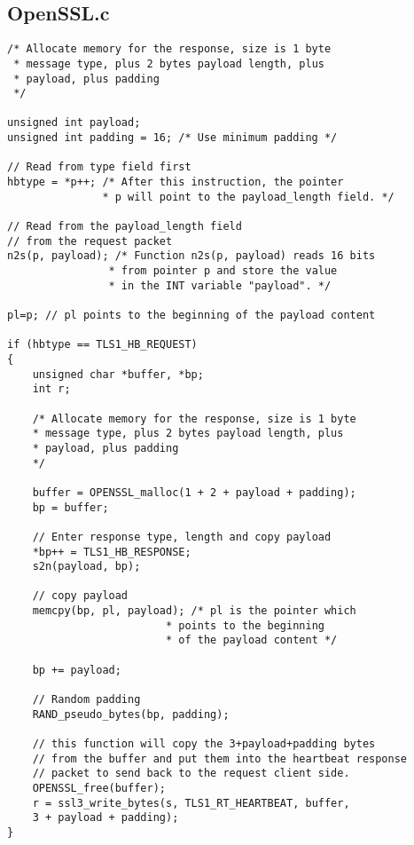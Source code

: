 \documentclass[a4paper,12pt]{article}
\begin{document}
\subsection{OpenSSL.c}
\begin{verbatim}
/* Allocate memory for the response, size is 1 byte
 * message type, plus 2 bytes payload length, plus
 * payload, plus padding
 */

unsigned int payload;
unsigned int padding = 16; /* Use minimum padding */

// Read from type field first
hbtype = *p++; /* After this instruction, the pointer
               * p will point to the payload_length field. */

// Read from the payload_length field
// from the request packet
n2s(p, payload); /* Function n2s(p, payload) reads 16 bits
                * from pointer p and store the value
                * in the INT variable "payload". */

pl=p; // pl points to the beginning of the payload content

if (hbtype == TLS1_HB_REQUEST)
{
	unsigned char *buffer, *bp;
	int r;

	/* Allocate memory for the response, size is 1 byte
	* message type, plus 2 bytes payload length, plus
	* payload, plus padding
	*/

	buffer = OPENSSL_malloc(1 + 2 + payload + padding);
	bp = buffer;

	// Enter response type, length and copy payload
	*bp++ = TLS1_HB_RESPONSE;
	s2n(payload, bp);

	// copy payload
	memcpy(bp, pl, payload); /* pl is the pointer which
	                     * points to the beginning
	                     * of the payload content */

	bp += payload;

	// Random padding
	RAND_pseudo_bytes(bp, padding);

	// this function will copy the 3+payload+padding bytes
	// from the buffer and put them into the heartbeat response
	// packet to send back to the request client side.
	OPENSSL_free(buffer);
	r = ssl3_write_bytes(s, TLS1_RT_HEARTBEAT, buffer,
	3 + payload + padding);
}
\end{verbatim}
\end{document}
